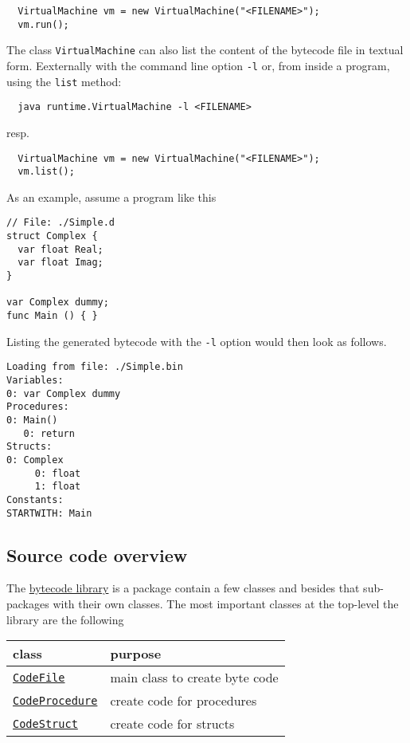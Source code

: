 \documentclass[11pt]{article}
\begin{document}
\lstset{language=java,label= ,caption= ,captionpos=b,numbers=none}
\begin{lstlisting}
  VirtualMachine vm = new VirtualMachine("<FILENAME>");
  vm.run();
\end{lstlisting}

The class \texttt{VirtualMachine} can also list the content of the bytecode file
in textual form. Eexternally with the command line option \texttt{-l} or, from
inside a program, using the \texttt{list} method:

\begin{verbatim}
  java runtime.VirtualMachine -l <FILENAME>
\end{verbatim}

resp.

\lstset{language=java,label= ,caption= ,captionpos=b,numbers=none}
\begin{lstlisting}
  VirtualMachine vm = new VirtualMachine("<FILENAME>");
  vm.list();
\end{lstlisting}

As an example, assume a program like this

\lstset{language=java,label= ,caption= ,captionpos=b,numbers=none}
\begin{lstlisting}
// File: ./Simple.d
struct Complex {
  var float Real;
  var float Imag;
}

var Complex dummy;
func Main () { }
\end{lstlisting}

Listing the generated bytecode with the \texttt{-l} option would then look as
follows.

\begin{verbatim}
Loading from file: ./Simple.bin
Variables:
0: var Complex dummy
Procedures:
0: Main()
   0: return
Structs:
0: Complex
     0: float
     1: float
Constants:
STARTWITH: Main
\end{verbatim}



\subsection{Source code overview}
\label{sec:org764fd8e}

The \href{../../bytecode/}{bytecode library} is a package contain a few classes and besides that
sub-packages with their own classes. The most important classes at the
top-level the library are the following

\begin{center}
\begin{tabular}{ll}
class & purpose\\
\hline
\href{../../bytecode/CodeFile.java}{\texttt{CodeFile}} & main class to create byte code\\
\href{../../bytecode/CodeProcedure.java}{\texttt{CodeProcedure}} & create code for procedures\\
\href{../../bytecode/CodeStruct.java}{\texttt{CodeStruct}} & create code for structs\\
\end{tabular}

\end{center}
\end{document}
